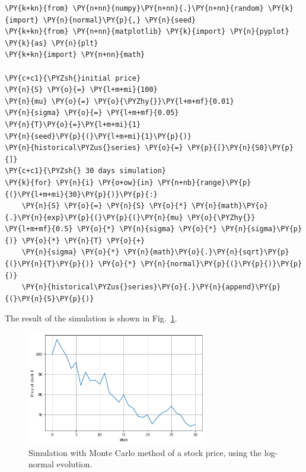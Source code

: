 \begin{tcolorbox}[breakable, size=fbox, boxrule=1pt, pad at break*=1mm,colback=cellbackground, colframe=cellborder]
\begin{Verbatim}[commandchars=\\\{\}]
\PY{k+kn}{from} \PY{n+nn}{numpy}\PY{n+nn}{.}\PY{n+nn}{random} \PY{k}{import} \PY{n}{normal}\PY{p}{,} \PY{n}{seed} 
\PY{k+kn}{from} \PY{n+nn}{matplotlib} \PY{k}{import} \PY{n}{pyplot} \PY{k}{as} \PY{n}{plt} 
\PY{k+kn}{import} \PY{n+nn}{math}
		
\PY{c+c1}{\PYZsh{}initial price}
\PY{n}{S} \PY{o}{=} \PY{l+m+mi}{100}
\PY{n}{mu} \PY{o}{=} \PY{o}{\PYZhy{}}\PY{l+m+mf}{0.01} 
\PY{n}{sigma} \PY{o}{=} \PY{l+m+mf}{0.05} 
\PY{n}{T}\PY{o}{=}\PY{l+m+mi}{1}
\PY{n}{seed}\PY{p}{(}\PY{l+m+mi}{1}\PY{p}{)} 
\PY{n}{historical\PYZus{}series} \PY{o}{=} \PY{p}{[}\PY{n}{S0}\PY{p}{]}
\PY{c+c1}{\PYZsh{} 30 days simulation}
\PY{k}{for} \PY{n}{i} \PY{o+ow}{in} \PY{n+nb}{range}\PY{p}{(}\PY{l+m+mi}{30}\PY{p}{)}\PY{p}{:}
    \PY{n}{S} \PY{o}{=} \PY{n}{S} \PY{o}{*} \PY{n}{math}\PY{o}{.}\PY{n}{exp}\PY{p}{(}\PY{p}{(}\PY{n}{mu} \PY{o}{\PYZhy{}} \PY{l+m+mf}{0.5} \PY{o}{*} \PY{n}{sigma} \PY{o}{*} \PY{n}{sigma}\PY{p}{)} \PY{o}{*} \PY{n}{T} \PY{o}{+}
    \PY{n}{sigma} \PY{o}{*} \PY{n}{math}\PY{o}{.}\PY{n}{sqrt}\PY{p}{(}\PY{n}{T}\PY{p}{)} \PY{o}{*} \PY{n}{normal}\PY{p}{(}\PY{p}{)}\PY{p}{)}
    \PY{n}{historical\PYZus{}series}\PY{o}{.}\PY{n}{append}\PY{p}{(}\PY{n}{S}\PY{p}{)}
\end{Verbatim}
\end{tcolorbox}
The result of the simulation is shown in Fig.~\ref{fig:stock_price_sim}.

\begin{figure}[htb]
	\centering
	\includegraphics[width=0.7\textwidth]{lesson4_files/lesson4_12_0.png}
	\caption{Simulation with Monte Carlo method of a stock price, using the log-normal evolution.}
	\label{fig:stock_price_sim}
\end{figure}


